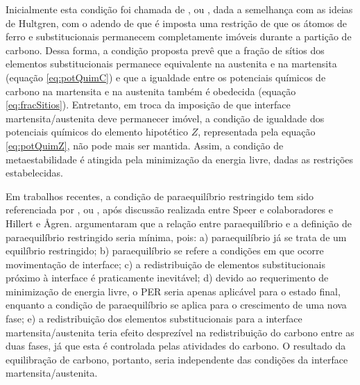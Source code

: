 Inicialmente esta condição foi chamada de , ou , dada a semelhança com as ideias de Hultgren, com o adendo de que é imposta uma restrição de que os átomos de ferro e substitucionais permanecem completamente imóveis durante a partição de carbono. Dessa forma, a condição proposta prevê que a fração de sítios dos elementos substitucionais permanece equivalente na austenita e na martensita (equação \ref{eq:potQuimC}) e que a igualdade entre os potenciais químicos de carbono na martensita e na austenita também é obedecida (equação \ref{eq:fracSitios}). Entretanto, em troca da imposição de que interface martensita/austenita deve permanecer imóvel, a condição de igualdade dos potenciais químicos do elemento hipotético $Z$, representada pela equação \ref{eq:potQuimZ}, não pode mais ser mantida. Assim, a condição de metaestabilidade é atingida pela minimização da energia livre, dadas as restrições estabelecidas.

Em trabalhos recentes, a condição de paraequilíbrio restringido tem sido referenciada por , ou , após discussão realizada entre Speer e colaboradores e Hillert e {\AA}gren\cite{Hillert2004a,Speer2005e,Hillert2005}.  argumentaram que a relação entre paraequilíbrio e a definição de paraequilíbrio restringido seria mínima, pois: a) paraequilíbrio já se trata de um equilíbrio restringido; b) paraequilíbrio se refere a condições em que ocorre movimentação de interface; c) a redistribuição de elementos substitucionais próximo à interface é praticamente inevitável; d) devido ao requerimento de minimização de energia livre, o PER seria apenas aplicável para o estado final, enquanto a condição de paraequilíbrio se aplica para o crescimento de uma nova fase; e) a redistribuição dos elementos substitucionais para a interface martensita/austenita teria efeito desprezível na redistribuição do carbono entre as duas fases, já que esta é controlada pelas atividades do carbono. O resultado da equilibração de carbono, portanto, seria independente das condições da interface martensita/austenita.

